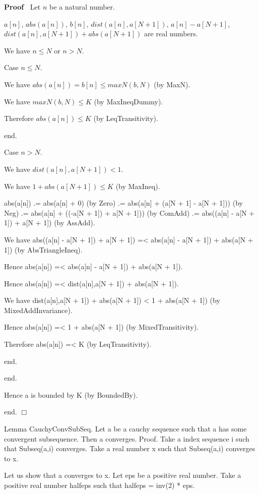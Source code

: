 \documentclass{article}
\newenvironment{forthel}{\begin{leftbar}}{\end{leftbar}}
\newenvironment{proof}{\noindent\textbf{Proof\ }}{\hspace*{\fill}$\Box$\medskip}
\begin{document}
\begin{forthel}
\begin{proof}
		Let $n$ be a natural number.
		
		$a[n]$, $abs(a[n])$, $b[n]$, $dist(a[n],a[N + 1])$, $a[n] - a[N + 1]$, $dist(a[n],a[N + 1]) + abs(a[N + 1])$ are real numbers.
		
		We have $n \leq N$ or $n > N$.
		
		Case $n \leq N$.
		
		We have $abs(a[n]) = b[n] \leq maxN(b,N)$ (by MaxN).
		
		We have $maxN(b,N) \leq K$ (by MaxIneqDummy).
		
		Therefore $abs(a[n]) \leq K$ (by LeqTransitivity).
		
		end.
		
		Case $n > N$.
		
		We have $dist(a[n],a[N + 1]) < 1$.
		
		We have $1 + abs(a[N + 1]) \leq K$ (by MaxIneq).
		
		abs(a[n]) .= abs(a[n] + 0) (by Zero)
		.= abs(a[n] + (a[N + 1] - a[N + 1])) (by Neg)
		.= abs(a[n] + ((-a[N + 1]) + a[N + 1])) (by ComAdd)
		.= abs((a[n] - a[N + 1]) + a[N + 1]) (by AssAdd).
		
		We have abs((a[n] - a[N + 1]) + a[N + 1]) =< abs(a[n] - a[N + 1]) + abs(a[N + 1]) (by AbsTriangleIneq).
		
		Hence abs(a[n]) =< abs(a[n] - a[N + 1]) + abs(a[N + 1]).
		
		Hence abs(a[n]) =< dist(a[n],a[N + 1]) + abs(a[N + 1]).
		
		We have dist(a[n],a[N + 1]) + abs(a[N + 1]) < 1 + abs(a[N + 1]) (by MixedAddInvariance).
		
		Hence abs(a[n]) =< 1 + abs(a[N + 1]) (by MixedTransitivity).
		
		Therefore abs(a[n]) =< K (by LeqTransitivity).
		
		end.
		
		end.
		
		Hence a is bounded by K (by BoundedBy).
		
		end.
	\end{proof}
	
	Lemma CauchyConvSubSeq.
	Let a be a cauchy sequence such that a has some convergent subsequence. Then a converges.
	Proof.
	Take a index sequence i such that Subseq(a,i) converges.
	Take a real number x such that Subseq(a,i) converges to x.
	
	Let us show that a converges to x.
	Let eps be a positive real number.
	Take a positive real number halfeps such that halfeps = inv(2) * eps.
	

\end{forthel}
\end{document}
